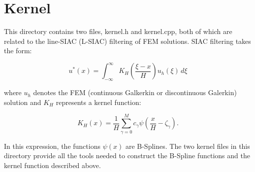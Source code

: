 %
\section{Kernel}

This directory contains two files, kernel.h and kernel.cpp, both of which are related to the line-SIAC (L-SIAC) filtering \cite{sanchez2016multi,jallepalli2017treatment} of FEM solutions.
SIAC filtering takes the form:

$$
u^*(x) = \int_{-\infty}^{\infty} K_H\left(\frac{\xi - x}{H}\right) u_h(\xi) \, d\xi
$$

\noindent where $u_h$ denotes the FEM (continuous Galkerkin or discontinuous Galerkin) solution and $K_H$ represents a kernel function:

$$
K_H(x) = \frac{1}{H} \sum_{\gamma = 0}^M c_\gamma \psi\left(\frac{x}{H} - \zeta_\gamma \right).
$$

In this expression, the functions $\psi(x)$ are B-Splines.  The two kernel files in this directory provide all the tools needed to construct the B-Spline functions and the kernel function described above.